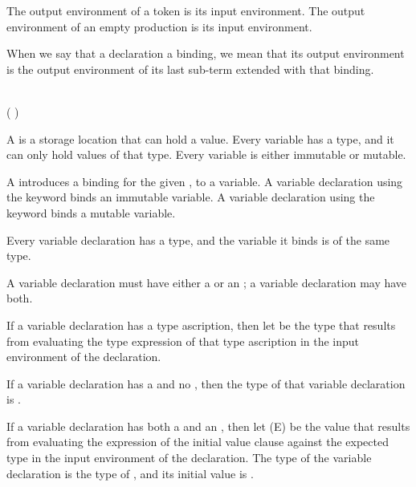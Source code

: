 The output environment of a token is its input environment.
The output environment of an empty production is its input environment.

When we say that a declaration  a binding, we mean that its output environment is the output environment of its last sub-term extended with that binding.


\begin{Syntax}
     \\
        ( \SynOr {}) 
            \SynOpt
            \SynOpt \code{;}
    
        \code{:} 
    
        \code{=} 
\end{Syntax}

A  is a storage location that can hold a value.
Every variable has a type, and it can only hold values of that type.
Every variable is either immutable or mutable.

A  introduces a binding for the given , to a variable.
A variable declaration using the  keyword binds an immutable variable.
A variable declaration using the  keyword binds a mutable variable.

Every variable declaration has a type, and the variable it binds is of the same type.

A variable declaration must have either a  or an ; a variable declaration may have both.

If a variable declaration has a type ascription, then let  be the type that results from evaluating the type expression of that type ascription in the input environment of the declaration.

If a variable declaration has a  and no , then the type of that variable declaration is .

If a variable declaration has both a  and an , then let \MetaVar(E) be the value that results from evaluating the expression of the initial value clause against the expected type  in the input environment of the declaration.
The type of the variable declaration is the type of , and its initial value is .

